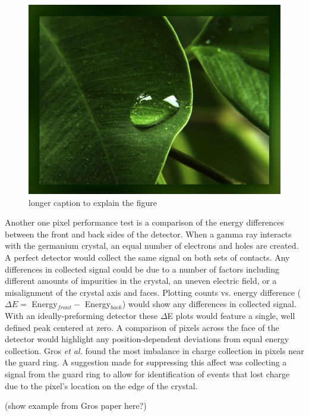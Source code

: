 \begin{figure}[h!]
  \centering
  \includegraphics[width=\textwidth, scale = 0.5]{leaf.jpg}
  \caption[shorter caption for list of figures]{longer caption to explain the figure}
\end{figure}

\indent Another one pixel performance test is a comparison of the energy differences between the front and back sides of the detector. When a gamma ray interacts with the germanium crystal, an equal number of electrons and holes are created. A perfect detector would collect the same signal on both sets of contacts. Any differences in collected signal could be due to a number of factors including different amounts of impurities in the crystal, an uneven electric field, or a misalignment of the crystal axis and faces. \cite{SG09} Plotting counts vs. energy difference ($\Delta E = $ Energy$_{front} - $ Energy$_{back}$) would show any differences in collected signal. With an ideally-preforming detector these $\Delta$E plots would feature a single, well defined peak centered at zero. A comparison of pixels across the face of the detector would highlight any position-dependent deviations from equal energy collection. Gros \textit{et al.} found the most imbalance in charge collection in pixels near the guard ring. A suggestion made for suppressing this affect was collecting a signal from the guard ring to allow for identification of events that lost charge due to the pixel's location on the edge of the crystal. \cite{SG09}

(show example from Gros paper here?)

